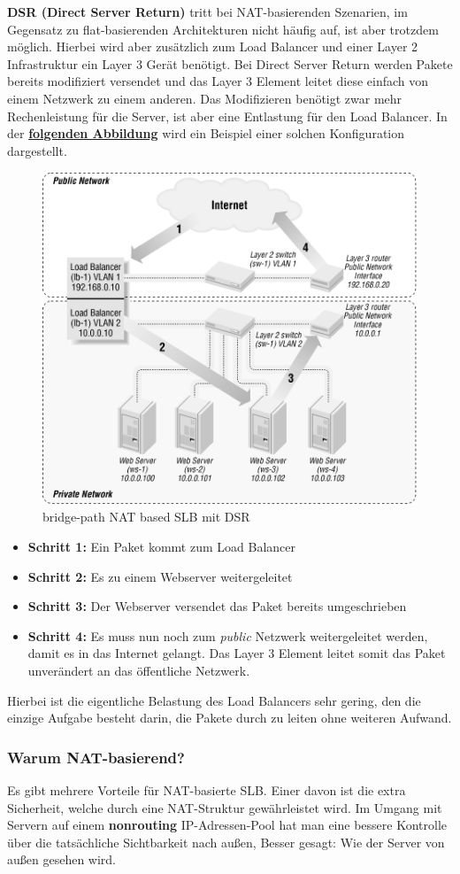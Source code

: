 \textbf{DSR (Direct Server Return)} tritt bei NAT-basierenden Szenarien, im Gegensatz zu flat-basierenden Architekturen nicht häufig auf, ist aber trotzdem möglich. Hierbei wird aber zusätzlich zum Load Balancer und einer Layer 2 Infrastruktur ein Layer 3 Gerät benötigt. Bei Direct Server Return werden Pakete bereits modifiziert versendet und das Layer 3 Element leitet diese einfach von einem Netzwerk zu einem anderen. Das Modifizieren benötigt zwar mehr Rechenleistung für die Server, ist aber eine Entlastung für den Load Balancer. In der \textbf{\hyperref[nat_slb_03]{folgenden Abbildung}} wird ein Beispiel einer solchen Konfiguration dargestellt.
\begin{figure}[!h]
	\begin{center}
		\includegraphics[width=0.5\linewidth]{images/slb_0703}
		\caption{bridge-path NAT based SLB mit DSR}
		\label{nat_slb_03}
	\end{center}
\end{figure}

\begin{itemize}
	\item \textbf{Schritt 1:}
	\subitem Ein Paket kommt zum Load Balancer
	\item \textbf{Schritt 2:}
	\subitem Es zu einem Webserver weitergeleitet
	\item \textbf{Schritt 3:}
	\subitem Der Webserver versendet das Paket bereits umgeschrieben
	\item \textbf{Schritt 4:}
	\subitem Es muss nun noch zum \textit{public} Netzwerk weitergeleitet werden, damit es in das Internet gelangt. Das  Layer 3 Element leitet somit das Paket unverändert an das öffentliche Netzwerk.
\end{itemize}
Hierbei ist die eigentliche Belastung des Load Balancers sehr gering, den die einzige Aufgabe besteht darin, die Pakete durch zu leiten ohne weiteren Aufwand.

\subsubsection{Warum NAT-basierend?}
Es gibt mehrere Vorteile für NAT-basierte SLB. Einer davon ist die extra Sicherheit, welche durch eine NAT-Struktur gewährleistet wird. Im Umgang mit Servern auf einem \textbf{nonrouting} IP-Adressen-Pool hat man eine bessere Kontrolle über die tatsächliche Sichtbarkeit nach außen, Besser gesagt: Wie der Server von außen gesehen wird.

